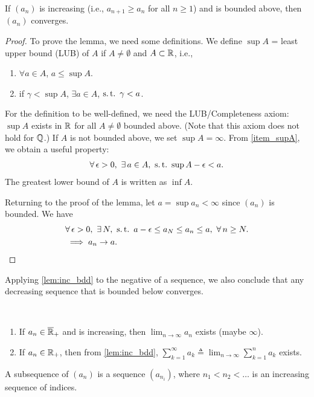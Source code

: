 \documentclass[12pt]{article}
\begin{document}
\begin{Lemma}\label{lem:inc_bdd}
If $(a_n)$ is increasing (i.e., $a_{n+1} \geq a_n$ for all $n\geq1$) and is bounded above, then $(a_n)$ converges.
\end{Lemma}
\begin{proof}
To prove the lemma, we need some definitions. We define $\sup{A}$ = least upper bound (LUB) of $A$ if $ A\neq \emptyset$ and $A \subset\mathbb{R}$, i.e., 
\begin{enumerate}[1)]
\item $\forall a \in A$, $a \leq \sup{A}$.
\item if $\gamma < \sup{A}$, $\exists a \in A$, $\st \gamma < a$. \label{item_supA}
\end{enumerate}
For the definition to be well-defined, we need the \rm{LUB/Completeness axiom}: $\sup{A}$ exists in $\mathbb{R}$ for all $A\ne\emptyset$ bounded above. (Note that this axiom does not hold for $\mathbb{Q}$.) If $A$ is not bounded above, we set $\sup A = \infty$. From \cref{item_supA}, we obtain a useful property:
\begin{align*}
\forall \epsilon > 0,\ \exists a \in A,\ \st \sup{A} - \epsilon < a.
\end{align*}
The greatest lower bound of $A$ is written as $\inf A$.

Returning to the proof of the lemma, let $a = \sup{a_n} < \infty$ since $(a_n)$ is bounded. We have 
\begin{align*}
&\forall \epsilon > 0,\ \exists N,\ \st a - \epsilon \leq a_N \leq a_n \leq a,\ \forall n \geq N. \\
&\implies a_n \to a.
\end{align*}
\end{proof}
Applying \cref{lem:inc_bdd} to the negative of a sequence, we also conclude that any decreasing sequence that is bounded below converges.

\begin{Remark}\
\begin{enumerate}
	\item If $a_n\in \overline{\mathbb{R}}_+$ and is increasing, then $\lim_{n\to\infty} a_n$ exists (maybe $\infty$).
	\item If $a_n\in\mathbb{R}_+$, then from \cref{lem:inc_bdd}, $\sum_{k=1}^\infty a_k \triangleq \lim_{n\to\infty} \sum_{k=1}^n a_k$ exists. 
\end{enumerate}
\end{Remark}

\begin{Definition}
A subsequence of $(a_n)$ is a sequence $(a_{n_i})$, where $n_1 < n_2 < \ldots$ is an increasing sequence of indices.
\end{Definition}
\end{document}
